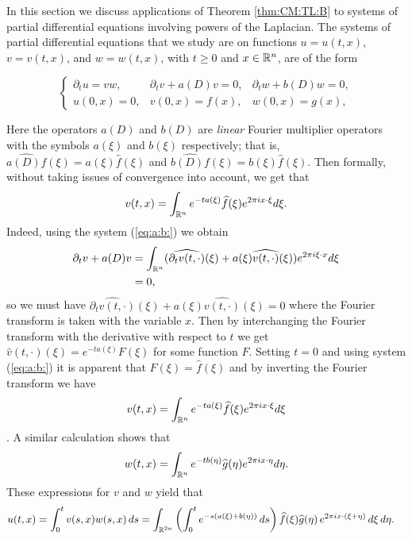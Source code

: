 In this section we discuss applications of Theorem \ref{thm:CM:TL:B} to systems of partial differential equations involving powers of the Laplacian. The systems of partial differential equations that we study are on functions $u=u(t,x)$, $v=v(t,x)$, and $w=w(t,x)$, with $t\geq 0$ and $x\in{{\mathbb R}^n}$, are of the form

\begin{equation} \label{eq:a:b:}
\left\{ \begin{array}{lll}  \partial_t u =vw, & \partial_t v +a(D) v = 0, & \partial_t w + b(D) w = 0, \\
  u(0,x)=0,&v(0,x)=f(x),&w(0,x) = g(x),
 \end{array} \right.
\end{equation}

Here the operators $a(D)$ and $b(D)$ are \textit{linear} Fourier multiplier operators with the symbols $a(\xi)$ and $b(\xi)$ respectively; that is, $\widehat{a(D)f}(\xi) = a(\xi)\widehat{f}(\xi)$ and $\widehat{b(D)f}(\xi) = b(\xi)\widehat{f}(\xi)$. Then formally, without taking issues of convergence into account, we get that 
\begin{equation}
v(t,x) = \int_{{\mathbb R}^n} e^{-ta(\xi)} \widehat{f}(\xi)e^{2\pi i x\cdot \xi} d\xi.
\end{equation}
Indeed, using the system (\ref{eq:a:b:}) we obtain
\begin{align*}
\partial_t v +a(D) v &= \int_{{\mathbb R}^n} (\widehat{\partial_t v(t,\cdot)}(\xi) + a(\xi)\widehat{v(t,\cdot)}(\xi))e^{2\pi i \xi \cdot x} d\xi \\
&=0,
\end{align*}
so we must have $\widehat{\partial_t v(t,\cdot)}(\xi) + a(\xi)\widehat{v(t,\cdot)}(\xi) = 0$ where the Fourier transform is taken with the variable $x$. Then by interchanging the Fourier transform with the derivative with respect to $t$ we get $\widehat{v}(t,\cdot)(\xi) = e^{-t a(\xi)} F(\xi)$ for some function $F$. Setting $t=0$ and using system (\ref{eq:a:b:}) it is apparent that $F(\xi) = \widehat{f}(\xi)$ and by inverting the Fourier transform we have $$v(t,x) = \int_{{\mathbb R}^n} e^{-t a(\xi)} \widehat{f}(\xi) e^{2\pi i x\cdot \xi} d\xi$$. A similar calculation shows that $$w(t,x) = \int_{{\mathbb R}^n} e^{-tb(\eta)} \widehat{g}(\eta) e^{2\pi i x\cdot \eta} d\eta.$$
These expressions for $v$ and $w$ yield that
\begin{align*}
u(t,x) & = \int_0^t v(s,x) w(s,x) \,ds  = \int_{\mathbb{R}^{2n}} \left(\int_0^t e^{-s (a(\xi)+b(\eta))} \,ds \right) \widehat{f}(\xi) \widehat{g}(\eta) \, e^{2\pi i x \cdot (\xi + \eta)} \, d\xi\, d\eta.
\end{align*}
